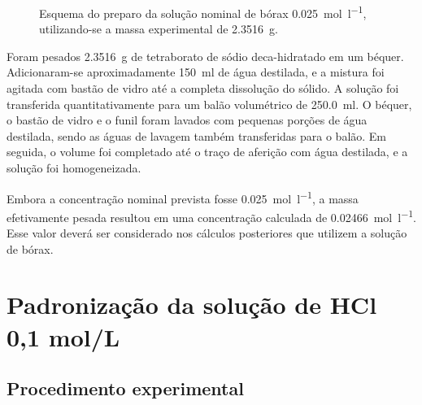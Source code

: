 \documentclass[a4paper,12pt]{article}
\begin{document}
\begin{figure}[H]
{%
}
\caption{Esquema do preparo da solução nominal de bórax \qty{0.025}{\mole\per\litre}, utilizando-se a massa experimental de \qty{2.3516}{\gram}.}
\label{fig:preparo_borax}
\end{figure}

Foram pesados \qty{2.3516}{\gram} de tetraborato de sódio deca-hidratado em um béquer. Adicionaram-se aproximadamente \qty{150}{\milli\litre} de água destilada, e a mistura foi agitada com bastão de vidro até a completa dissolução do sólido. A solução foi transferida quantitativamente para um balão volumétrico de \qty{250.0}{\milli\litre}. O béquer, o bastão de vidro e o funil foram lavados com pequenas porções de água destilada, sendo as águas de lavagem também transferidas para o balão. Em seguida, o volume foi completado até o traço de aferição com água destilada, e a solução foi homogeneizada.

\begin{tcolorbox}[
  title=Concentração da solução preparada,
  colback=quadrocinza,
  colframe=black!65,
  boxrule=0.6pt,
  arc=1mm
]
Embora a concentração nominal prevista fosse \qty{0.025}{\mole\per\litre}, a massa efetivamente pesada resultou em uma concentração calculada de \qty{0.02466}{\mole\per\litre}. Esse valor deverá ser considerado nos cálculos posteriores que utilizem a solução de bórax.
\end{tcolorbox}

\section{Padronização da solução de HCl 0,1 mol/L}

\subsection{Procedimento experimental}
\end{document}
